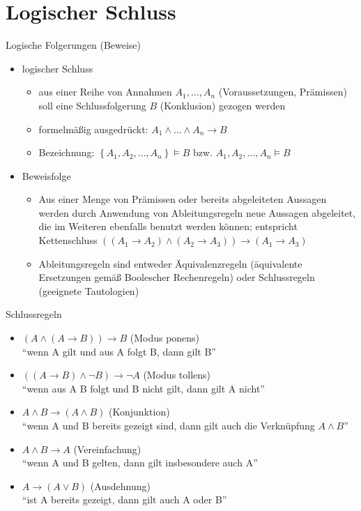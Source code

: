 \section{Logischer Schluss}
\begin{frame}{Logische Folgerungen (Beweise)}
	\begin{itemize}
		\item logischer Schluss
		\begin{itemize}
			\item aus einer Reihe von Annahmen $A_1,\ldots,A_n$ (Voraussetzungen, Prämissen) soll eine Schlussfolgerung $B$ (Konklusion) gezogen werden
			\item formelmäßig ausgedrückt: $A_1 \land \ldots \land A_n \rightarrow B$
			\item Bezeichnung: $\left\{A_1, A_2, \ldots, A_n\right\} \models B$ bzw. $A_1, A_2, \ldots, A_n \models B$
		\end{itemize}
		\item Beweisfolge
		\begin{itemize}
			\item Aus einer Menge von Prämissen oder bereits abgeleiteten Aussagen werden durch Anwendung von Ableitungsregeln neue Aussagen abgeleitet, die im Weiteren ebenfalls benutzt werden können; entspricht Kettenschluss $((A_1 \rightarrow A_2) \land (A_2 \rightarrow A_3)) \rightarrow (A_1 \rightarrow A_3)$
			\item Ableitungsregeln sind entweder Äquivalenzregeln (äquivalente Ersetzungen gemäß Boolescher Rechenregeln) oder Schlussregeln (geeignete Tautologien)
		\end{itemize}
	\end{itemize}
\end{frame}

\begin{frame}{Schlussregeln}
	\begin{itemize}
		\item $(A \land (A \rightarrow B)) \rightarrow B$ (Modus ponens)\\
		"`wenn A gilt und aus A folgt B, dann gilt B"'
		\item $((A \rightarrow B) \land \neg B) \rightarrow \neg A$ (Modus tollens)\\
		"`wenn aus A B folgt und B nicht gilt, dann gilt A nicht"'
		\item $A \land B \rightarrow (A \land B)$ (Konjunktion)\\
		"`wenn A und B bereits gezeigt sind, dann gilt auch die Verknüpfung $A \land B$"'
		\item $A \land B \rightarrow A$ (Vereinfachung)\\
		"`wenn A und B gelten, dann gilt insbesondere auch A"'
		\item $A \rightarrow (A \lor B)$ (Ausdehnung)\\
		"`ist A bereits gezeigt, dann gilt auch A oder B"'
	\end{itemize}
\end{frame}

